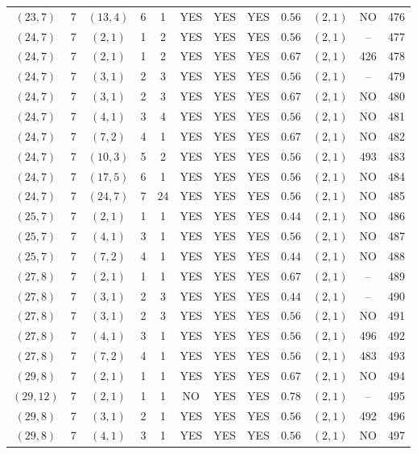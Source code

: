 \begin{longtable}{|c|c|c|c|c|c|c|c|c|c|c|c|}
$(23,7)$ & 7 & $(13,4)$ & 6 & 1 & YES & YES & YES & $0.56$ & $(2,1)$ & NO & 476\\
$(24,7)$ & 7 & $(2,1)$ & 1 & 2 & YES & YES & YES & $0.56$ & $(2,1)$ & -- & 477\\
$(24,7)$ & 7 & $(2,1)$ & 1 & 2 & YES & YES & YES & $0.67$ & $(2,1)$ & 426 & 478\\
$(24,7)$ & 7 & $(3,1)$ & 2 & 3 & YES & YES & YES & $0.56$ & $(2,1)$ & -- & 479\\
$(24,7)$ & 7 & $(3,1)$ & 2 & 3 & YES & YES & YES & $0.67$ & $(2,1)$ & NO & 480\\
$(24,7)$ & 7 & $(4,1)$ & 3 & 4 & YES & YES & YES & $0.56$ & $(2,1)$ & NO & 481\\
$(24,7)$ & 7 & $(7,2)$ & 4 & 1 & YES & YES & YES & $0.67$ & $(2,1)$ & NO & 482\\
$(24,7)$ & 7 & $(10,3)$ & 5 & 2 & YES & YES & YES & $0.56$ & $(2,1)$ & 493 & 483\\
$(24,7)$ & 7 & $(17,5)$ & 6 & 1 & YES & YES & YES & $0.56$ & $(2,1)$ & NO & 484\\
$(24,7)$ & 7 & $(24,7)$ & 7 & 24 & YES & YES & YES & $0.56$ & $(2,1)$ & NO & 485\\
$(25,7)$ & 7 & $(2,1)$ & 1 & 1 & YES & YES & YES & $0.44$ & $(2,1)$ & NO & 486\\
$(25,7)$ & 7 & $(4,1)$ & 3 & 1 & YES & YES & YES & $0.56$ & $(2,1)$ & NO & 487\\
$(25,7)$ & 7 & $(7,2)$ & 4 & 1 & YES & YES & YES & $0.44$ & $(2,1)$ & NO & 488\\
$(27,8)$ & 7 & $(2,1)$ & 1 & 1 & YES & YES & YES & $0.67$ & $(2,1)$ & -- & 489\\
$(27,8)$ & 7 & $(3,1)$ & 2 & 3 & YES & YES & YES & $0.44$ & $(2,1)$ & -- & 490\\
$(27,8)$ & 7 & $(3,1)$ & 2 & 3 & YES & YES & YES & $0.56$ & $(2,1)$ & NO & 491\\
$(27,8)$ & 7 & $(4,1)$ & 3 & 1 & YES & YES & YES & $0.56$ & $(2,1)$ & 496 & 492\\
$(27,8)$ & 7 & $(7,2)$ & 4 & 1 & YES & YES & YES & $0.56$ & $(2,1)$ & 483 & 493\\
$(29,8)$ & 7 & $(2,1)$ & 1 & 1 & YES & YES & YES & $0.67$ & $(2,1)$ & NO & 494\\
$(29,12)$ & 7 & $(2,1)$ & 1 & 1 & NO & YES & YES & $0.78$ & $(2,1)$ & -- & 495\\
$(29,8)$ & 7 & $(3,1)$ & 2 & 1 & YES & YES & YES & $0.56$ & $(2,1)$ & 492 & 496\\
$(29,8)$ & 7 & $(4,1)$ & 3 & 1 & YES & YES & YES & $0.56$ & $(2,1)$ & NO & 497\\

\end{longtable}

